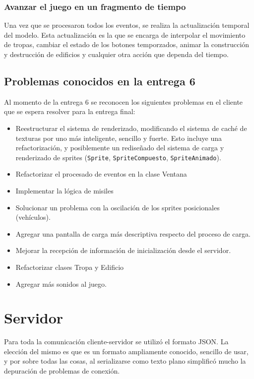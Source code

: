 \documentclass[titlepage,a4paper,12pt]{article}
\begin{document}
\subsubsection{Avanzar el juego en un fragmento de tiempo}
Una vez que se procesaron todos los eventos, se realiza la actualización temporal del modelo. Esta actualización es la que se encarga de interpolar el movimiento de tropas, cambiar el estado de los botones temporzados, animar la construcción y destrucción de edificios y cualquier otra acción que dependa del tiempo.

\subsection{Problemas conocidos en la entrega 6}

Al momento de la entrega 6 se reconocen los siguientes problemas en el cliente que se espera resolver para la entrega final:
\begin{itemize}
    \item Reestructurar el sistema de renderizado, modificando el sistema de caché de texturas por uno más inteligente, sencillo y fuerte. Esto incluye una refactorización, y posiblemente un rediseñado del sistema de carga y renderizado de sprites (\texttt{Sprite}, \texttt{SpriteCompuesto}, \texttt{SpriteAnimado}).
    \item Refactorizar el procesado de eventos en la clase Ventana
    \item Implementar la lógica de misiles
    \item Solucionar un problema con la oscilación de los sprites posicionales (vehículos).
    \item Agregar una pantalla de carga más descriptiva respecto del proceso de carga.
    \item Mejorar la recepción de información de inicialización desde el servidor.
    \item Refactorizar clases Tropa y Edificio
    \item Agregar más sonidos al juego.
\end{itemize}

\newpage
\section{Servidor}
Para toda la comunicación cliente-servidor se utilizó el formato JSON. La elección del mismo es que es un formato ampliamente conocido, sencillo de usar, y por sobre todas las cosas, al serializarse como texto plano simplificó mucho la depuración de problemas de conexión.
\end{document}
